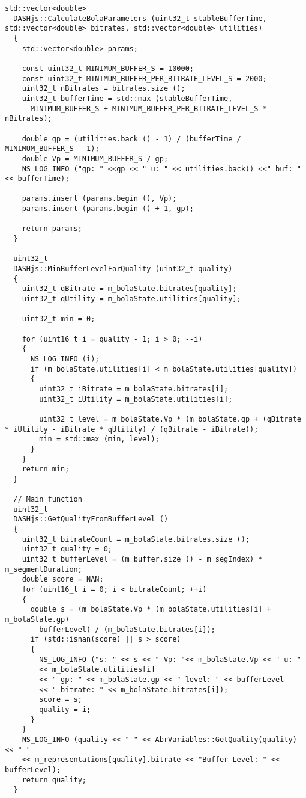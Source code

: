 \begin{lstlisting}[language=myC++, caption={DASHjs.cc}, captionpos=b]
  std::vector<double>
  DASHjs::CalculateBolaParameters (uint32_t stableBufferTime, std::vector<double> bitrates, std::vector<double> utilities)
  {
    std::vector<double> params;
  
    const uint32_t MINIMUM_BUFFER_S = 10000;
    const uint32_t MINIMUM_BUFFER_PER_BITRATE_LEVEL_S = 2000;
    uint32_t nBitrates = bitrates.size ();
    uint32_t bufferTime = std::max (stableBufferTime,
      MINIMUM_BUFFER_S + MINIMUM_BUFFER_PER_BITRATE_LEVEL_S * nBitrates);
  
    double gp = (utilities.back () - 1) / (bufferTime / MINIMUM_BUFFER_S - 1);
    double Vp = MINIMUM_BUFFER_S / gp;
    NS_LOG_INFO ("gp: " <<gp << " u: " << utilities.back() <<" buf: "<< bufferTime);
  
    params.insert (params.begin (), Vp);
    params.insert (params.begin () + 1, gp);
  
    return params;
  }
  
  uint32_t
  DASHjs::MinBufferLevelForQuality (uint32_t quality)
  {
    uint32_t qBitrate = m_bolaState.bitrates[quality];
    uint32_t qUtility = m_bolaState.utilities[quality];
  
    uint32_t min = 0;
  
    for (uint16_t i = quality - 1; i > 0; --i)
    {
      NS_LOG_INFO (i);
      if (m_bolaState.utilities[i] < m_bolaState.utilities[quality])
      {
        uint32_t iBitrate = m_bolaState.bitrates[i];
        uint32_t iUtility = m_bolaState.utilities[i];
  
        uint32_t level = m_bolaState.Vp * (m_bolaState.gp + (qBitrate * iUtility - iBitrate * qUtility) / (qBitrate - iBitrate));
        min = std::max (min, level);
      }
    }
    return min;
  }
  
  // Main function
  uint32_t
  DASHjs::GetQualityFromBufferLevel ()
  {
    uint32_t bitrateCount = m_bolaState.bitrates.size ();
    uint32_t quality = 0;
    uint32_t bufferLevel = (m_buffer.size () - m_segIndex) * m_segmentDuration;
    double score = NAN;
    for (uint16_t i = 0; i < bitrateCount; ++i)
    {
      double s = (m_bolaState.Vp * (m_bolaState.utilities[i] + m_bolaState.gp)
      - bufferLevel) / (m_bolaState.bitrates[i]);
      if (std::isnan(score) || s > score)
      {
        NS_LOG_INFO ("s: " << s << " Vp: "<< m_bolaState.Vp << " u: "
        << m_bolaState.utilities[i]
        << " gp: " << m_bolaState.gp << " level: " << bufferLevel
        << " bitrate: " << m_bolaState.bitrates[i]);
        score = s;
        quality = i;
      }
    }
    NS_LOG_INFO (quality << " " << AbrVariables::GetQuality(quality) << " "
    << m_representations[quality].bitrate << "Buffer Level: " << bufferLevel);
    return quality;
  }
  

\end{lstlisting}
